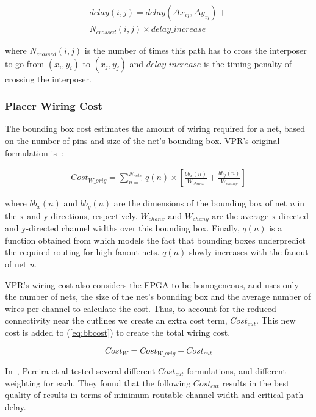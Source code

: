 \documentclass[journal]{IEEEtran}
\begin{document}
\setlength{\arraycolsep}{0.0em}
\begin{multline}
\label{eq:timing_cost}
delay(i,j) = delay(\Delta x_{ij}, \Delta y_{ij}) + \\
N_{crossed}(i,j) \times delay\_increase
\end{multline}
\setlength{\arraycolsep}{5pt}

where $N_{crossed}(i,j)$ is the number of times this path has to cross the interposer to go from $(x_i,y_i)$ to $(x_j,y_j)$ and $delay\_increase$ is the timing penalty of crossing the interposer.

\subsubsection{Placer Wiring Cost}
The bounding box cost estimates the amount of wiring required for a net, based on the number of pins and size of the net's bounding box. VPR's original formulation is~\cite{betz1997vpr}:

\setlength{\arraycolsep}{0.0em}
\begin{multline}
\label{eq:bbcost}
Cost_{W\_orig} = \sum_{n=1}^{N_{nets}} q(n) \times [\frac{bb_x(n)}{W_{chanx}} + \frac{bb_y(n)}{W_{chany}}]
\end{multline}
\setlength{\arraycolsep}{5pt}


where $bb_x(n)$ and $bb_y(n)$ are the dimensions of the bounding box of net \textit{n} in the x and y directions, respectively. $W_{chanx}$ and $W_{chany}$ are the average x-directed and y-directed channel widths over this bounding box. Finally, $q(n)$ is a function obtained from \cite{icann} which models the fact that bounding boxes underpredict the required routing for high fanout nets. $q(n)$ slowly increases with the fanout of net \textit{n}.

VPR's wiring cost also considers the FPGA to be homogeneous, and uses only the number of nets, the size of the net's bounding box and the average number of wires per channel to calculate the cost. Thus, to account for the reduced connectivity near the cutlines we create an extra cost term, $Cost_{cut}$. This new cost is added to (\ref{eq:bbcost}) to create the total wiring cost.

\setlength{\arraycolsep}{0.0em}
\begin{equation}
\label{eq:total_wiring}
Cost_{W} = Cost_{W\_orig} + Cost_{cut}
\end{equation}
\setlength{\arraycolsep}{5pt}

In~\cite{interposer2014}, Pereira et al tested several different $Cost_{cut}$ formulations, and different weighting for each. They found that the following $Cost_{cut}$ results in the best quality of results in terms of minimum routable channel width and critical path delay.
\end{document}
